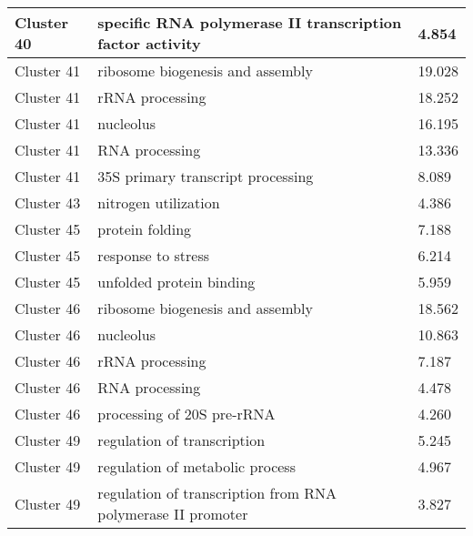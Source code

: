 {\begin{longtable}{|p{1in}|p{4in}|p{1in}|}
Cluster 40 & specific RNA polymerase II transcription factor activity & 4.854 \\ \hline
Cluster 41 & ribosome biogenesis and assembly & 19.028 \\ \hline
Cluster 41 & rRNA processing & 18.252 \\ \hline
Cluster 41 & nucleolus & 16.195 \\ \hline
Cluster 41 & RNA processing & 13.336 \\ \hline
Cluster 41 & 35S primary transcript processing & 8.089 \\ \hline
Cluster 43 & nitrogen utilization & 4.386 \\ \hline
Cluster 45 & protein folding & 7.188 \\ \hline
Cluster 45 & response to stress & 6.214 \\ \hline
Cluster 45 & unfolded protein binding & 5.959 \\ \hline
Cluster 46 & ribosome biogenesis and assembly & 18.562 \\ \hline
Cluster 46 & nucleolus & 10.863 \\ \hline
Cluster 46 & rRNA processing & 7.187 \\ \hline
Cluster 46 & RNA processing & 4.478 \\ \hline
Cluster 46 & processing of 20S pre-rRNA & 4.260 \\ \hline
Cluster 49 & regulation of transcription & 5.245 \\ \hline
Cluster 49 & regulation of metabolic process & 4.967 \\ \hline
Cluster 49 & regulation of transcription from RNA polymerase II promoter & 3.827 \\ \hline

\end{longtable}
}